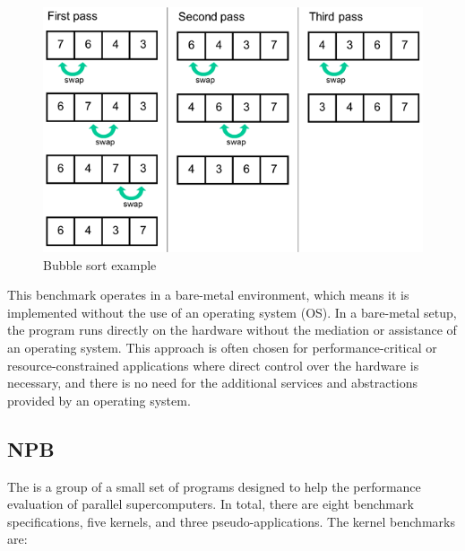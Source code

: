 \begin{figure}[H]
	\centering
 	\includegraphics[width=0.7\linewidth]{Images/bubble_sort.png}
 	\caption{Bubble sort example}
	 \label{fig_bubble_sort}
\end{figure}

This benchmark operates in a bare-metal environment, which means it is implemented without the use of an operating system (OS). In a bare-metal setup, the program runs directly on the hardware without the mediation or assistance of an operating system. This approach is often chosen for performance-critical or resource-constrained applications where direct control over the hardware is necessary, and there is no need for the additional services and abstractions provided by an operating system.

\subsection{NPB}

The  \cite{bailey1994parallel} is a group of a small set of programs designed to help the performance evaluation of parallel supercomputers. In total, there are eight benchmark specifications, five kernels, and three pseudo-applications. The kernel benchmarks are:

